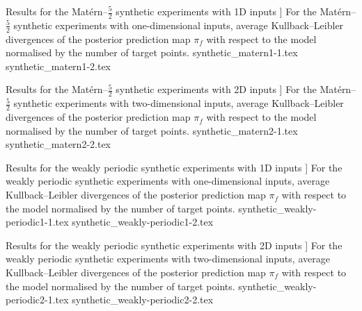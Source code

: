 \documentclass[12pt, twoside]{report}
\begin{document}
\begin{table}[t]
    \centering
    \caption
    [
        Results for the Mat\'ern--$\tfrac52$ synthetic experiments with 1D inputs
    ]
    {
        For the Mat\'ern--$\frac52$ synthetic experiments with one-dimensional inputs, average Kullback--Leibler divergences of the posterior prediction map $\pi_f$ with respect to the model normalised by the number of target points.
        \oneddescription
        \latentvariabledescription
        \diagonaldescription
        \trivialdescription
        \numbersdescription
    }
    \label{tab:synthetic_matern-1}
    \footnotesize
    \setlength{\tabcolsep}{2pt}
    {synthetic_matern1-1.tex}
    {synthetic_matern1-2.tex}
\end{table}

\begin{table}[t]
    \centering
    \caption
    [
        Results for the Mat\'ern--$\tfrac52$ synthetic experiments with 2D inputs
    ]
    {
        For the Mat\'ern--$\frac52$ synthetic experiments with two-dimensional inputs, average Kullback--Leibler divergences of the posterior prediction map $\pi_f$ with respect to the model normalised by the number of target points.
        \twoddescription
        \diagonaldescription
        \trivialdescription
        \numbersdescription
    }
    \label{tab:synthetic_matern-2}
    \footnotesize
    \setlength{\tabcolsep}{2pt}
    {synthetic_matern2-1.tex}
    {synthetic_matern2-2.tex}
\end{table}

\begin{table}[t]
    \centering
    \caption
    [
        Results for the weakly periodic synthetic experiments with 1D inputs
    ]
    {
        For the weakly periodic synthetic experiments with one-dimensional inputs, average Kullback--Leibler divergences of the posterior prediction map $\pi_f$ with respect to the model normalised by the number of target points.
        \oneddescription
        \latentvariabledescription
        \diagonaldescription
        \trivialdescription
        \numbersdescription
    }
    \label{tab:synthetic_weakly-periodic-1}
    \footnotesize
    \setlength{\tabcolsep}{2pt}
    {synthetic_weakly-periodic1-1.tex}
    {synthetic_weakly-periodic1-2.tex}
\end{table}

\begin{table}[t]
    \centering
    \caption
    [
        Results for the weakly periodic synthetic experiments with 2D inputs
    ]
    {
        For the weakly periodic synthetic experiments with two-dimensional inputs, average Kullback--Leibler divergences of the posterior prediction map $\pi_f$ with respect to the model normalised by the number of target points.
        \twoddescription
        \latentvariabledescription
        \diagonaldescription
        \trivialdescription
        \numbersdescription
    }
    \label{tab:synthetic_weakly-periodic-2}
    \footnotesize
    \setlength{\tabcolsep}{2pt}
    {synthetic_weakly-periodic2-1.tex}
    {synthetic_weakly-periodic2-2.tex}
\end{table}
\end{document}
